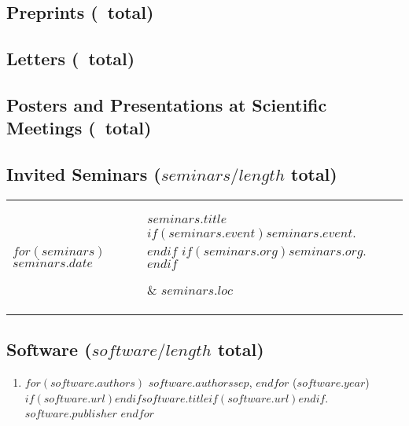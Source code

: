 \documentclass[martgin, line]{article}
\begin{document}
\begin{enumerate}
  
\end{enumerate}


\subsection*{Preprints (\npreprint\ total)}

\begin{enumerate}
  
\end{enumerate}


\subsection*{Letters (\nletters\ total)}

\begin{enumerate}
  
\end{enumerate}


\subsection*{Posters and Presentations at Scientific Meetings (\npres\ total)}

\begin{enumerate}
  
\end{enumerate}


\subsection*{Invited Seminars ($seminars/length$ total)}

\setlength{\extrarowheight}{.75em}
\begin{longtable}[l]{lp{3.75in}l}
  $for(seminars)$
  $seminars.date$&
  \parbox[t]{3.75in} { $seminars.title$\\
    \scriptsize{%
      $if(seminars.event)$\textit{$seminars.event$}. $endif$%
      $if(seminars.org)$$seminars.org$.$endif$%
    }} & $seminars.loc$\\
  $endfor$
\end{longtable}
\setlength{\extrarowheight}{0em}

\subsection*{Software ($software/length$ total)}

\begin{enumerate}
  $for(software)$
  \item
  $for(software.authors)$
  $software.authors$$sep$,
  $endfor$
  ($software.year$)
  $if(software.url)$\href{$software.url$}{$endif$$software.title$$if(software.url)$}$endif$.
  $software.publisher$
  $endfor$
\end{enumerate}
\end{document}
